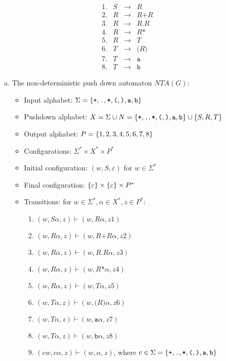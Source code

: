 \begin{solution}
\[
 \begin{array}{llcl}
    1. & S & \to & R \\
    2. & R & \to & R \texttt{+} R \\
    3. & R & \to & R \texttt{.} R \\
    4. & R & \to & R\texttt{*} \\
    5. & R & \to & T \\
    6. & T & \to & \texttt{(} R \texttt{)} \\
    7. & T & \to & \texttt{a} \\
    8. & T & \to & \texttt{b}
 \end{array}
\]

\begin{enumerate}[(a)]
\item The non-deterministic push down automaton $NTA(G)$:
\begin{itemize}
  \item Input alphabet: $\Sigma = \left\{ \texttt{+}, \texttt{.}, \texttt{*}, \texttt{(}, \texttt{)}, \texttt{a}, \texttt{b} \right\}$
  \item Pushdown alphabet: $X = \Sigma \cup N = \left\{ \texttt{+}, \texttt{.}, \texttt{*}, \texttt{(}, \texttt{)}, \texttt{a}, \texttt{b} \right\} \cup \left\{ S, R, T \right\}$
  \item Output alphabet: $P=\left\{ 1,2,3,4,5,6,7,8 \right\}$
  \item Configurations: $\Sigma^* \times X^* \times P^*$
  \item Initial configuration: $(w, S, \varepsilon)$ for $w \in \Sigma^*$
  \item Final configuration: $\left\{ \varepsilon \right\} \times \left\{ \varepsilon \right\} \times P^*$
  \item Transitions: for $w \in \Sigma^*, \alpha \in X^*, z \in P^*$:
  \begin{enumerate}
    \item $(w,S \alpha,z) \vdash (w,R \alpha,z1)$
    \item $(w,R \alpha,z) \vdash (w,R \texttt{+} R \alpha,z2)$
    \item $(w,R \alpha,z) \vdash (w,R \texttt{.} R \alpha,z3)$
    \item $(w,R \alpha,z) \vdash (w,R \texttt{*} \alpha,z4)$
    \item $(w,R \alpha,z) \vdash (w,T \alpha,z5)$
    \item $(w,T \alpha,z) \vdash (w,\texttt{(} R \texttt{)} \alpha,z6)$
    \item $(w,T \alpha,z) \vdash (w,\texttt{a} \alpha,z7)$
    \item $(w,T \alpha,z) \vdash (w,\texttt{b} \alpha,z8)$
    \item $(cw,c\alpha,z) \vdash (w,\alpha,z)$, where $c \in \Sigma = \left\{ \texttt{+}, \texttt{.}, \texttt{*}, \texttt{(}, \texttt{)}, \texttt{a}, \texttt{b} \right\}$
  \end{enumerate}


\end{itemize}
\end{enumerate}
\end{solution}
